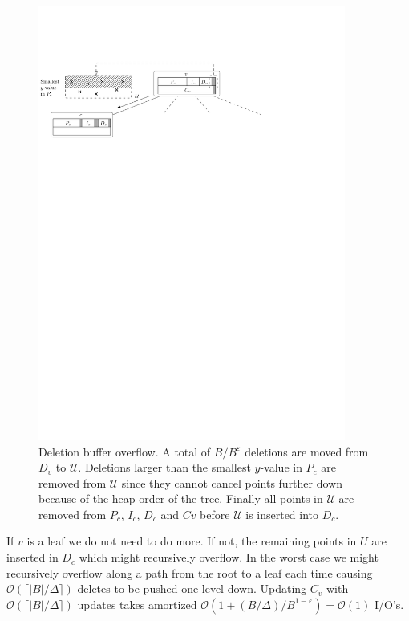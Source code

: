 \documentclass[twoside,11pt,openright]{report}
\def \epsilon {\varepsilon}
\begin{document}
\begin{enumerate}[label=(\roman*)]
	\begin{figure}[htp!]
		\centering
		\includegraphics[width=0.9\textwidth]{../figures/brodal_deletion_buffer_overflow}
		\caption{Deletion buffer overflow. A total of $B/B^\epsilon$ deletions are moved from $D_v$ to $\mathcal{U}$. Deletions larger than the smallest $y$-value in $P_c$ are removed from $\mathcal{U}$ since they cannot cancel points further down because of the heap order of the tree. Finally all points in $\mathcal{U}$ are removed from $P_c$, $I_c$, $D_c$ and $Cv$ before $\mathcal{U}$ is inserted into $D_c$.}
		\label{fig:brodal_deletion_buffer_overflow}
	\end{figure}	
	
	If $v$ is a leaf we do not need to do more. If not, the remaining points in $U$ are inserted in $D_c$ which might recursively overflow. In the worst case we might recursively overflow along a path from the root to a leaf each time causing $\mathcal{O}(\lceil \vert B \vert / \Delta \rceil)$ deletes to be pushed one level down. Updating $C_v$ with $\mathcal{O}(\lceil \vert B \vert / \Delta \rceil)$ updates takes amortized $\mathcal{O}(1+ (B/\Delta) / B^{1-\epsilon}) = \mathcal{O}(1)$ I/O's.
	

\end{enumerate}
\end{document}

